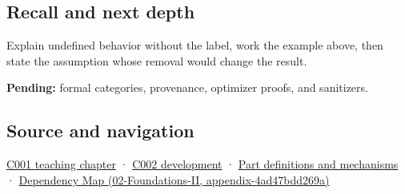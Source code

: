 \subsection{Recall and next depth}\label{recall-and-next-depth}

Explain undefined behavior without the label, work the example above, then state the assumption whose removal would change the result.

\textbf{Pending:} formal categories, provenance, optimizer proofs, and sanitizers.

\subsection{Source and navigation}\label{source-and-navigation}

\href{Continuous\%20Notes/Computing\%20Foundations\%20-\%20From\%20Bits\%20to\%20C++\%20and\%20Systems\%20APIs\#From\%20a\%20signal\%20to\%20an\%20interpretation}{C001 teaching chapter} · \href{Continuous\%20Notes/Computing\%20Foundations\%20-\%20From\%20Bits\%20to\%20C++\%20and\%20Systems\%20APIs\#Arithmetic\%20becomes\%20a\%20policy}{C002 development} · \hyperref[appendix-fd090d982a15]{Part definitions and mechanisms} · \href{}{Dependency Map (02-Foundations-II, appendix-4ad47bdd269a)}
